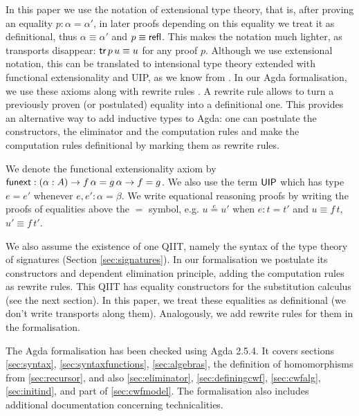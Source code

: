 \documentclass[acmsmall,review]{acmart}\settopmatter{printfolios=true,printccs=false,printacmref=false}
\begin{document}
In this paper we use the notation of extensional type theory, that is,
after proving an equality $p : \alpha=\alpha'$, in later proofs
depending on this equality we treat it as definitional, thus
$\alpha\equiv\alpha'$ and $p \equiv \mathsf{refl}$. This makes the notation
much lighter, as transports disappear: $\mathsf{tr}\,p\,u\equiv u$ for any
proof $p$. Although we use extensional notation, this can
be translated to intensional type theory extended with functional
extensionality and UIP, as we know from
\cite{hofmann95conservativity, Oury2005,theo}. In our Agda formalisation, we use these axioms
along with rewrite rules \cite{cockx}. A
rewrite rule allows to turn a previously proven (or postulated)
equality into a definitional one. %
This provides
an alternative way to add inductive types to Agda: one can postulate
the constructors, the eliminator and the computation rules and make
the computation rules definitional by marking them as rewrite rules.

We denote the functional extensionality axiom by $\mathsf{funext} : (\alpha :
A)\rightarrow f\,\alpha = g\,\alpha \rightarrow f = g$. We also use the term $\mathsf{UIP}$
which has type $e = e'$ whenever $e,e':\alpha=\beta$. We write
equational reasoning proofs by writing the proofs of equalities above
the $=$ symbol, e.g. $u \overset{e}{=} u'$ when $e:t = t'$ and
$u\equiv f\,t$, $u'\equiv f\,t'$.

We also assume the existence of one QIIT, namely the syntax of the
type theory of signatures (Section \ref{sec:signatures}). In our
formalisation we postulate its constructors and dependent elimination
principle, adding the computation rules as rewrite rules. This QIIT has
equality constructors for the substitution calculus (see the next
section). In this paper, we treat these equalities as definitional (we
don't write transports along them). Analogously, we add rewrite rules
for them in the formalisation.

The Agda formalisation has been checked using Agda 2.5.4. It covers
sections \ref{sec:syntax}, \ref{sec:syntaxfunctions},
\ref{sec:algebras}, the definition of homomorphisms from
\ref{sec:recursor}, and also \ref{sec:eliminator},
\ref{sec:definingcwf}, \ref{sec:cwfalg}, \ref{sec:initind}, and part
of \ref{sec:cwfmodel}. The formalisation also includes additional
documentation concerning technicalities.
\end{document}
